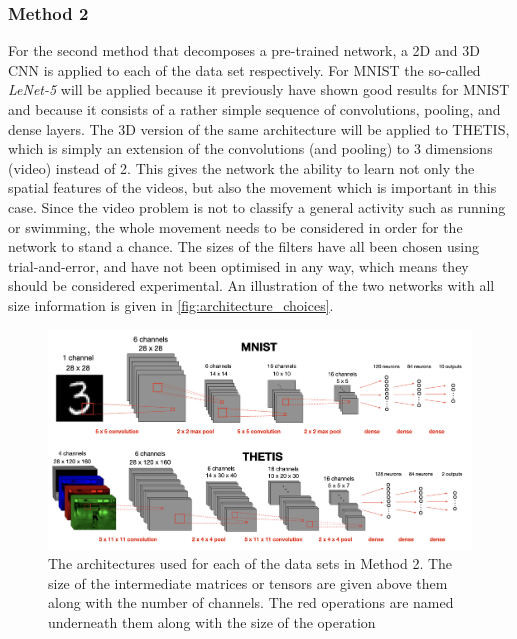 \subsubsection{Method 2}
For the second method that decomposes a pre-trained network, a 2D and 3D CNN is applied to each of the data set respectively. For MNIST the so-called \textit{LeNet-5} will be applied because it previously have shown good results for MNIST\cite{MNIST} and because it consists of a rather simple sequence of convolutions, pooling, and dense layers. The 3D version of the same architecture will be applied to THETIS, which is simply an extension of the convolutions (and pooling) to 3 dimensions (video) instead of 2. This gives the network the ability to learn not only the spatial features of the videos, but also the movement which is important in this case. Since the video problem is not to classify a general activity such as running or swimming, the whole movement needs to be considered in order for the network to stand a chance. The sizes of the filters have all been chosen using trial-and-error, and have not been optimised in any way, which means they should be considered experimental. An illustration of the two networks with all size information is given in \autoref{fig:architecture_choices}.
\begin{figure}
    \centering
    \captionsetup{width=.95\linewidth}
    \includegraphics[width=\linewidth]{Pics/05_methodology/architecture_choice_illustration.png}
    \caption{The architectures used for each of the data sets in Method 2. The size of the intermediate matrices or tensors are given above them along with the number of channels. The red operations are named underneath them along with the size of the operation}
    \label{fig:architecture_choices}
\end{figure}

